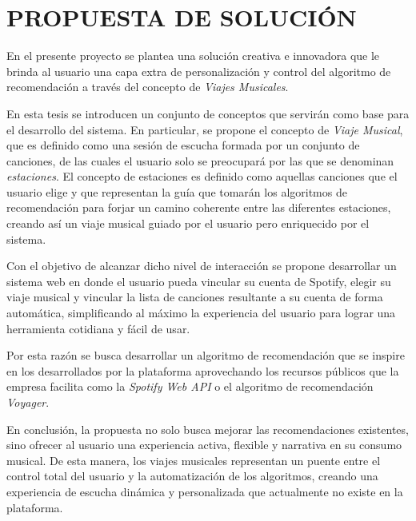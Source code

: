 \newpage
\thispagestyle{plain}
\vspace*{0.2cm}

\section*{PROPUESTA DE SOLUCIÓN}

En el presente proyecto se plantea una solución creativa e innovadora que le brinda al usuario una capa extra de personalización y control del algoritmo de recomendación a través del concepto de \textit{Viajes Musicales}.

En esta tesis se introducen un conjunto de conceptos que servirán como base para el desarrollo del sistema. En particular, se propone el concepto de \textit{Viaje Musical}, que es definido como una sesión de escucha formada por un conjunto de canciones, de las cuales el usuario solo se preocupará por las que se denominan \textit{estaciones}. El concepto de estaciones es definido como  aquellas canciones que el usuario elige y que representan la guía que tomarán los algoritmos de recomendación para forjar un camino coherente entre las diferentes estaciones, creando así un viaje musical guiado por el usuario pero enriquecido por el sistema.

Con el objetivo de alcanzar dicho nivel de interacción se propone desarrollar un sistema web en donde el usuario pueda vincular su cuenta de Spotify, elegir su viaje musical y vincular la lista de canciones resultante a su cuenta de forma automática, simplificando al máximo la experiencia del usuario para lograr una herramienta cotidiana y fácil de usar.

Por esta razón se busca desarrollar un algoritmo de recomendación que se inspire en los desarrollados por la plataforma aprovechando los recursos públicos que la empresa facilita como la \textit{Spotify Web API} o el algoritmo de recomendación \textit{Voyager}.

En conclusión, la propuesta no solo busca mejorar las recomendaciones existentes, sino ofrecer al usuario una experiencia activa, flexible y narrativa en su consumo musical. De esta manera, los viajes musicales representan un puente entre el control total del usuario y la automatización de los algoritmos, creando una experiencia de escucha dinámica y personalizada que actualmente no existe en la plataforma.

\newpage
\thispagestyle{plain}
\vspace*{0.2cm}

